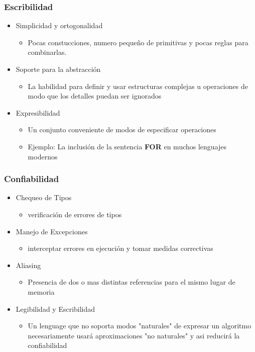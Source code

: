 \documentclass[11pt]{article}
\begin{document}
\subsubsection*{Escribilidad}
\label{sec:orgheadline4}

\begin{itemize}
\item Simplicidad y ortogonalidad
\begin{itemize}
\item Pocas constucciones, numero pequeño de primitivas y pocas reglas
para combinarlas.
\end{itemize}
\item Soporte para la abstracción
\begin{itemize}
\item La habilidad para definir y usar estructuras complejas u
operaciones de modo que los detalles puedan ser ignorados
\end{itemize}
\item Expresibilidad
\begin{itemize}
\item Un conjunto conveniente de modos de especificar operaciones
\item Ejemplo: La inclusión de la sentencia \textbf{FOR} en  muchos lenguajes modernos
\end{itemize}
\end{itemize}

\subsubsection*{Confiabilidad}
\label{sec:orgheadline5}

\begin{itemize}
\item Chequeo de Tipos
\begin{itemize}
\item verificación de errores de tipos
\end{itemize}
\item Manejo de Excepciones
\begin{itemize}
\item interceptar errores en ejecución y tomar medidas correctivas
\end{itemize}
\item Aliasing
\begin{itemize}
\item Presencia de dos o mas distintas referencias para el mismo lugar
de memoria
\end{itemize}
\item Legibilidad y Escribilidad
\begin{itemize}
\item Un lenguage que no soporta modos "naturales" de expresar un
algoritmo necesariamente usará aproximaciones "no naturales" y asi
reducirá la confiabilidad
\end{itemize}
\end{itemize}
\end{document}
